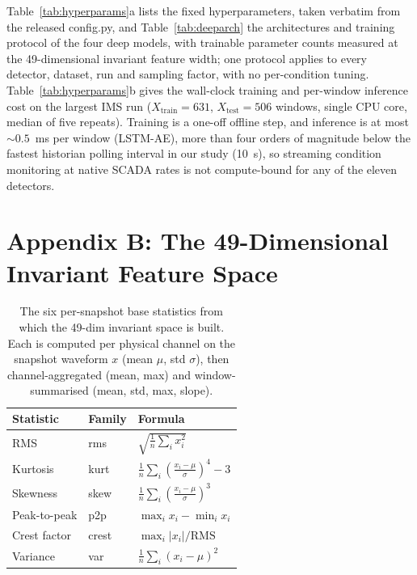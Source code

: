 \documentclass[IJPHM, 2026, 0]{PHMSociety}
\begin{document}


Table~\ref{tab:hyperparams}a lists the fixed hyperparameters, taken verbatim from the released config.py, and Table~\ref{tab:deeparch} the architectures and training protocol of the four deep models, with trainable parameter counts measured at the 49-dimensional invariant feature width; one protocol applies to every detector, dataset, run and sampling factor, with no per-condition tuning. Table~\ref{tab:hyperparams}b gives the wall-clock training and per-window inference cost on the largest IMS run ($X_{\text{train}}=631$, $X_{\text{test}}=506$ windows, single CPU core, median of five repeats). Training is a one-off offline step, and inference is at most ${\sim}0.5$~ms per window (LSTM-AE), more than four orders of magnitude below the fastest historian polling interval in our study (10~s), so streaming condition monitoring at native SCADA rates is not compute-bound for any of the eleven detectors.






\section*{Appendix B: The 49-Dimensional Invariant Feature Space}
\begin{table}[t] \footnotesize
	\begin{center}
	\caption{The six per-snapshot base statistics from which the 49-dim invariant space is built. Each is computed per physical channel on the snapshot waveform $x$ (mean $\mu$, std $\sigma$), then channel-aggregated (mean, max) and window-summarised (mean, std, max, slope).}
	\label{tab:basestats}
	\begin{tabular}{l l l}
		\hline \hline
		\textbf{Statistic} & \textbf{Family} & \textbf{Formula} \\
		\hline
		RMS & rms & $\sqrt{\tfrac{1}{n}\sum_i x_i^2}$ \\
		Kurtosis & kurt & $\tfrac{1}{n}\sum_i (\tfrac{x_i-\mu}{\sigma})^4 - 3$ \\
		Skewness & skew & $\tfrac{1}{n}\sum_i (\tfrac{x_i-\mu}{\sigma})^3$ \\
		Peak-to-peak & p2p & $\max_i x_i - \min_i x_i$ \\
		Crest factor & crest & $\max_i |x_i| / \text{RMS}$ \\
		Variance & var & $\tfrac{1}{n}\sum_i (x_i-\mu)^2$ \\
		\hline \hline
	\end{tabular}
	\end{center}
\end{table}
\end{document}
